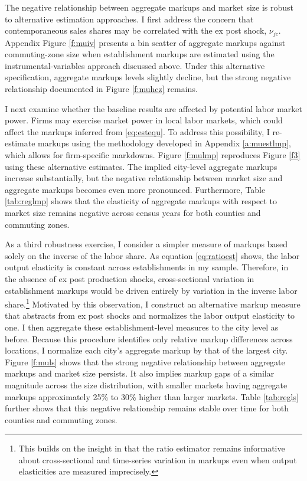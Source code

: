 The negative relationship between aggregate markups and market size is robust to alternative estimation approaches. I first address the concern that contemporaneous sales shares may be correlated with the ex post shock, $\nu_{jc}$. Appendix Figure \ref{f:muiv} presents a bin scatter of aggregate markups against commuting-zone size when establishment markups are estimated using the instrumental-variables approach discussed above. Under this alternative specification, aggregate markups levels slightly decline, but the strong negative relationship documented in Figure \ref{f:muhcz} remains.

I next examine whether the baseline results are affected by potential labor market power. Firms may exercise market power in local labor markets, which could affect the markups inferred from \eqref{eq:estequ}. To address this possibility, I re-estimate markups using the methodology developed in Appendix \ref{a:muestlmp}, which allows for firm-specific markdowns. Figure \ref{f:mulmp} reproduces Figure \ref{f3} using these alternative estimates. The implied city-level aggregate markups increase substantially, but the negative relationship between market size and aggregate markups becomes even more pronounced. Furthermore, Table \ref{tab:reglmp} shows that the elasticity of aggregate markups with respect to market size remains negative across census years for both counties and commuting zones.

As a third robustness exercise, I consider a simpler measure of markups based solely on the inverse of the labor share. As equation \eqref{eq:ratioest} shows, the labor output elasticity is constant across establishments in my sample. Therefore, in the absence of ex post production shocks, cross-sectional variation in establishment markups would be driven entirely by variation in the inverse labor share.\footnote{This builds on the insight in \textcite{DeRidderGrassi&Morzenti24} that the ratio estimator remains informative about cross-sectional and time-series variation in markups even when output elasticities are measured imprecisely.} Motivated by this observation, I construct an alternative markup measure that abstracts from ex post shocks and normalizes the labor output elasticity to one. I then aggregate these establishment-level measures to the city level as before. Because this procedure identifies only relative markup differences across locations, I normalize each city’s aggregate markup by that of the largest city. Figure \ref{f:muls} shows that the strong negative relationship between aggregate markups and market size persists. It also implies markup gaps of a similar magnitude across the size distribution, with smaller markets having aggregate markups approximately 25\% to 30\% higher than larger markets. Table \ref{tab:regls} further shows that this negative relationship remains stable over time for both counties and commuting zones.

